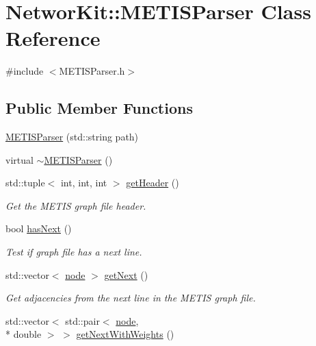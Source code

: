 \hypertarget{class_networ_kit_1_1_m_e_t_i_s_parser}{\section{Networ\-Kit\-:\-:M\-E\-T\-I\-S\-Parser Class Reference}
\label{class_networ_kit_1_1_m_e_t_i_s_parser}
}


{\ttfamily \#include $<$M\-E\-T\-I\-S\-Parser.\-h$>$}

\subsection*{Public Member Functions}
\begin{DoxyCompactItemize}
\item 
\hyperlink{class_networ_kit_1_1_m_e_t_i_s_parser_a62ac589d8023e184e3bd055738a96f28}{M\-E\-T\-I\-S\-Parser} (std\-::string path)
\item 
virtual \hyperlink{class_networ_kit_1_1_m_e_t_i_s_parser_ae6be699914a8acc8bf720775c6244771}{$\sim$\-M\-E\-T\-I\-S\-Parser} ()
\item 
std\-::tuple$<$ int, int, int $>$ \hyperlink{class_networ_kit_1_1_m_e_t_i_s_parser_a413bd539051620d54dd6b8c3ef7303bf}{get\-Header} ()
\begin{DoxyCompactList}\small\item\em Get the M\-E\-T\-I\-S graph file header. \end{DoxyCompactList}\item 
bool \hyperlink{class_networ_kit_1_1_m_e_t_i_s_parser_a52732b9d2ffdead3f05ac8a7fde62c6a}{has\-Next} ()
\begin{DoxyCompactList}\small\item\em Test if graph file has a next line. \end{DoxyCompactList}\item 
std\-::vector$<$ \hyperlink{namespace_networ_kit_a53fe3e4fd04ea024160e4d024dfebadf}{node} $>$ \hyperlink{class_networ_kit_1_1_m_e_t_i_s_parser_a9146943a37df8c696623019a877bd09c}{get\-Next} ()
\begin{DoxyCompactList}\small\item\em Get adjacencies from the next line in the M\-E\-T\-I\-S graph file. \end{DoxyCompactList}\item 
std\-::vector$<$ std\-::pair$<$ \hyperlink{namespace_networ_kit_a53fe3e4fd04ea024160e4d024dfebadf}{node}, \\*
double $>$ $>$ \hyperlink{class_networ_kit_1_1_m_e_t_i_s_parser_aecb8c91b00d90a592b7251c5ac05753c}{get\-Next\-With\-Weights} ()
\end{DoxyCompactItemize}
